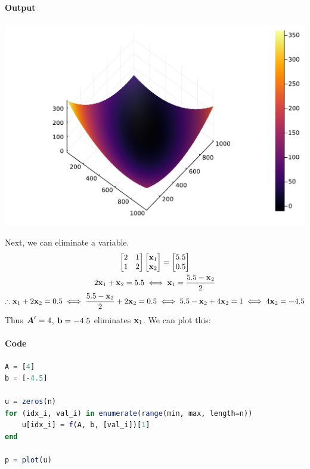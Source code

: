 \documentclass[]{exam}
\let\oldparagraph\paragraph
\renewcommand{\paragraph}[1]{\oldparagraph{#1}\mbox{}}
\begin{document}
\begin{questions}
\begin{enumerate}[label=\arabic*.]
		\paragraph{Output}
		\begin{center}
			\includegraphics[width=.7\textwidth]{code/q4-1.pdf}
		\end{center}
		Next, we can eliminate a variable.
		\begin{gather*}
			\begin{bmatrix} 2 & 1 \\ 1 & 2 \end{bmatrix} \begin{bmatrix} \boldsymbol{\mathrm{x}}_1 \\ \boldsymbol{\mathrm{x}}_2 \end{bmatrix} = \begin{bmatrix} 5.5 \\ 0.5 \end{bmatrix} \\
			2 \boldsymbol{\mathrm{x}}_1 + \boldsymbol{\mathrm{x}}_2 = 5.5 \iff \boldsymbol{\mathrm{x}}_1 = \frac{5.5 - \boldsymbol{\mathrm{x}}_2}{2} \\
			\therefore \boldsymbol{\mathrm{x}}_1 + 2 \boldsymbol{\mathrm{x}}_2 = 0.5 \iff \frac{5.5 - \boldsymbol{\mathrm{x}}_2}{2} + 2 \boldsymbol{\mathrm{x}}_2 = 0.5 \iff 5.5 - \boldsymbol{\mathrm{x}}_2 + 4 \boldsymbol{\mathrm{x}}_2 = 1 \iff 4\boldsymbol{\mathrm{x}}_2 = -4.5
		\end{gather*}
		Thus $\boldsymbol{A}' = 4$, $\boldsymbol{\mathrm{b}} = -4.5$ eliminates $\boldsymbol{\mathrm{x}}_1$. We can plot this:
		\paragraph{Code}
		\begin{lstlisting}[language=julia]
A = [4]
b = [-4.5]

u = zeros(n)
for (idx_i, val_i) in enumerate(range(min, max, length=n))
	u[idx_i] = f(A, b, [val_i])[1]
end

p = plot(u)
		\end{lstlisting}

\end{enumerate}
\end{questions}
\end{document}
